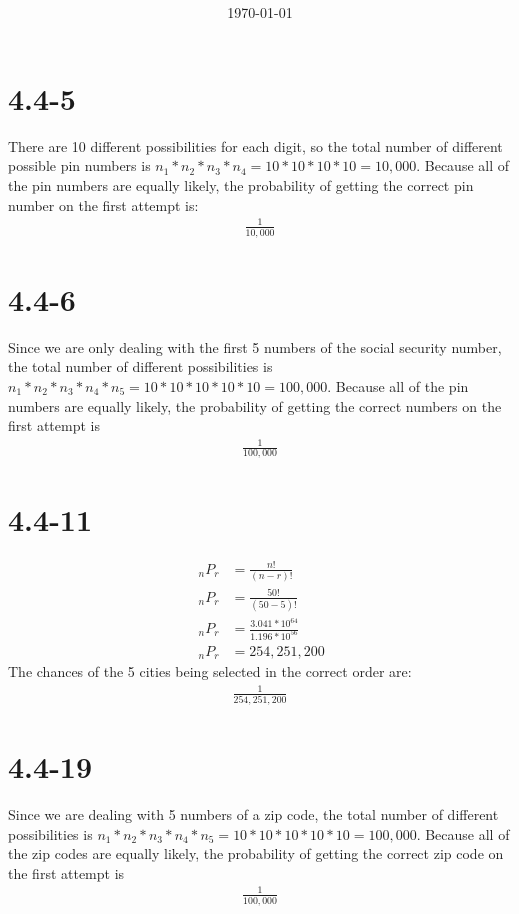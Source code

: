 \documentclass[12pt,fleqn]{article}
\title{\classdescription\ \\ \classname\ \\ $\ $ \\ \assignment}
\author{\authorname}
\date{\today}
\newcommand{\chapter}{4.4}
\newcommand{\problem}[1]{\vspace{5ex}\section*{\chapter-#1}}
\begin{document}
\maketitle

\problem{5}
There are 10 different possibilities for each digit, so the total number of different possible pin numbers is $n_1 * n_2 * n_3 * n_4 = 10 * 10 * 10 * 10 = 10,000$. Because all of the pin numbers are equally likely, the probability of getting the correct pin number on the first attempt is:
\begin{align*}
\frac{1}{10,000}
\end{align*}


\problem{6}
Since we are only dealing with the first 5 numbers of the social security number, the total number of different possibilities is $n_1 * n_2 * n_3 * n_4 * n_5 = 10 * 10 * 10 * 10 * 10 = 100,000$. Because all of the pin numbers are equally likely, the probability of getting the correct numbers on the first attempt is
\begin{align*}
\frac{1}{100,000}
\end{align*}


\problem{11}
\begin{align*}
~_nP_r &= \frac{n!}{(n - r)!} \\
~_nP_r &= \frac{50!}{(50 - 5)!} \\
~_nP_r &= \frac{3.041 * 10^{64}}{1.196 * 10^{56}} \\
~_nP_r &= 254,251,200
\end{align*}
The chances of the 5 cities being selected in the correct order are:
\begin{align*}
  \frac{1}{254,251,200}
\end{align*}


\problem{19}
Since we are dealing with 5 numbers of a zip code, the total number of different possibilities is $n_1 * n_2 * n_3 * n_4 * n_5 = 10 * 10 * 10 * 10 * 10 = 100,000$. Because all of the zip codes are equally likely, the probability of getting the correct zip code on the first attempt is
\begin{align*}
\frac{1}{100,000}
\end{align*}
\end{document}
